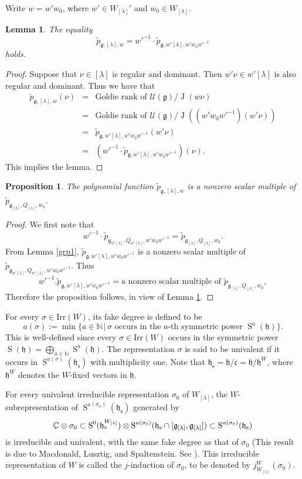 \documentclass[12pt,a4paper]{amsart}
\newcommand{\BN}{{\mathbb {N}}}
\newcommand{\CU}{{\mathcal {U}}}
\newcommand{\oJ}{\operatorname{J}}
\newcommand{\oS}{\operatorname{S}}
\newcommand{\g}{\mathfrak g}
\newcommand{\h}{\mathfrak h}
\renewcommand{\c}{\mathfrak c}
\numberwithin{equation}{section}
\newtheorem{lem}[thm]{Lemma}
\newtheorem{prop}[thm]{Proposition}
\theoremstyle{remark}
\def\Irr{\mathrm{Irr}}
\newcommand{\Lam}{{[\lambda]}}
\begin{document}
Write $w=w'w_0$, where $w'\in W_\Lam'$ and $w_0\in W_\Lam$.


\begin{lem} \label{grp2}
The  equality
\[
\tilde p_{\g,\Lam,w}={w'}^{-1}\cdot \tilde p_{\g, w'\Lam,w'w_0{w'}^{-1}}
\]
holds.

\end{lem}
\begin{proof}
Suppose that $\nu\in \Lam$ is regular and dominant. Then $w'\nu\in w'\Lam$ is also regular and dominant. Thus we have that
\begin{eqnarray*}
   \tilde p_{\g,\Lam,w}(\nu)&=&\textrm{Goldie rank of } \CU(\g)/\oJ(w\nu)\\
   &=&\textrm{Goldie rank of } \CU(\g)/\oJ((w'w_0w'^{-1})(w'\nu))\\
   &=&  \tilde p_{\g,w'\Lam,w'w_0w'^{-1}}(w'\nu)\\
    &=& ( w'^{-1}\cdot \tilde p_{\g,w'\Lam,w'w_0 w'^{-1}})(\nu).
\end{eqnarray*}
This implies the lemma.
\end{proof}


\begin{prop} \label{grp3}
The polynomial function
$
\tilde p_{\g,\Lam,w}$ is a nonzero scalar multiple of $\tilde p_{\g_\Lam,Q_\Lam,w_0}$.
\end{prop}
\begin{proof} We first note that
\[
  w'^{-1}\cdot \tilde p_{\g_{w'\Lam},Q_{w'\Lam},w'w_0w'^{-1}}= \tilde p_{\g_\Lam,Q_\Lam,w_0}.
\]
From Lemma \ref{grp1}, $\tilde p_{\g, w'\Lam,w'w_0{w'}^{-1}} $ is a nonzero scalar multiple of $\tilde p_{\g_{w'\Lam},Q_{w'\Lam},w'w_0{w'}^{-1}}$. Thus
\[
  w'^{-1}.\tilde p_{\g, w'\Lam,w'w_0{w'}^{-1}}= \textrm{a nonzero scalar multiple of }\tilde p_{\g_\Lam,Q_\Lam,w_0},
\]
Therefore  the proposition follows, in view of Lemma \ref{grp2}.
 \end{proof}


 For every $\sigma\in \Irr(W)$, its fake degree is defined to be
  \[
 a(\sigma):=\min\{a\in \BN\,|\, \sigma \textrm{ occurs in the $a$-th symmetric power $\oS^a(\h)$}\}.
 \]
This is well-defined since every  $\sigma\in \Irr(W)$ occurs in the symmetric power $\oS(\h)=\bigoplus_{a\in \BN}\oS^a(\h)$. The representation $\sigma$ is said to be univalent if it occurs in $\oS^{a(\sigma)}(\h_{\mathrm s})$ with multiplicity one. Note that $\h_{\mathrm s}=\h/\c=\h/\h^W$, where $\h^W$ denotes the $W$-fixed vectors in $\h$.

For every univalent irreducible representation $\sigma_0$ of $W_\Lam$, the $W$-subrepresentation of $\oS^{a(\sigma_0)}(\h_{\mathrm s})$ generated by
\[
  \C\otimes \sigma_0\subset \oS^0(\h_{\mathrm s}^{W_\Lam})\otimes \oS^{a(\sigma_0)}(\h_{\mathrm s}\cap [\g_\Lam, \g_\Lam])\subset  \oS^{a(\sigma_0)}(\h_{\mathrm s})
\]
is irreducible and univalent, with the same fake degree as that of $\sigma_0$ (This result is due to Macdonald, Lusztig, and Spaltenstein. See \cite[Chapter 11]{Carter}). This irreducible representation of $W$ is called the $j$-induction of $\sigma_0$, to be denoted by $j_{W_\Lam}^W(\sigma_0)$.
\end{document}
